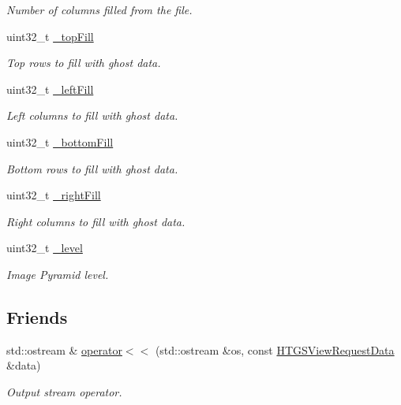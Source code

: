 \begin{DoxyCompactItemize}
\begin{DoxyCompactList}\small\item\em Number of columns filled from the file. \end{DoxyCompactList}\item 
uint32\+\_\+t \hyperlink{classfi_1_1HTGSViewRequestData_a6b1d10ec57580794909ffdea14a81e6e}{\+\_\+top\+Fill}
\begin{DoxyCompactList}\small\item\em Top rows to fill with ghost data. \end{DoxyCompactList}\item 
uint32\+\_\+t \hyperlink{classfi_1_1HTGSViewRequestData_a64abbf3a786abe66e4cd8c05887031ab}{\+\_\+left\+Fill}
\begin{DoxyCompactList}\small\item\em Left columns to fill with ghost data. \end{DoxyCompactList}\item 
uint32\+\_\+t \hyperlink{classfi_1_1HTGSViewRequestData_ac786787eaf8ce695c3c7c17c84f92791}{\+\_\+bottom\+Fill}
\begin{DoxyCompactList}\small\item\em Bottom rows to fill with ghost data. \end{DoxyCompactList}\item 
uint32\+\_\+t \hyperlink{classfi_1_1HTGSViewRequestData_ae020baac2a6c7c9c1d5c49460d27571f}{\+\_\+right\+Fill}
\begin{DoxyCompactList}\small\item\em Right columns to fill with ghost data. \end{DoxyCompactList}\item 
uint32\+\_\+t \hyperlink{classfi_1_1HTGSViewRequestData_a5d3a66e6ca0fd85b64ead947fff81209}{\+\_\+level}
\begin{DoxyCompactList}\small\item\em Image Pyramid level. \end{DoxyCompactList}\end{DoxyCompactItemize}
\subsection*{Friends}
\begin{DoxyCompactItemize}
\item 
std\+::ostream \& \hyperlink{classfi_1_1HTGSViewRequestData_a259a7de171ef78a14053f020090588f0}{operator$<$$<$} (std\+::ostream \&os, const \hyperlink{classfi_1_1HTGSViewRequestData}{H\+T\+G\+S\+View\+Request\+Data} \&data)
\begin{DoxyCompactList}\small\item\em Output stream operator. \end{DoxyCompactList}\end{DoxyCompactItemize}



